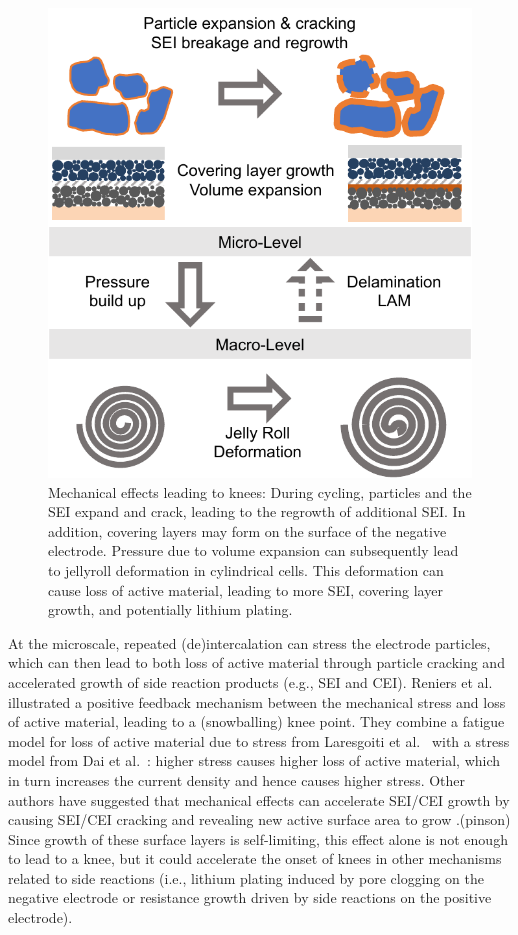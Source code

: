 \documentclass[journal=jpcl, manuscript=article, layout=onecolumn]{achemso}
\begin{document}
\begin{figure}
\centering
\includegraphics[scale = 1]{figures/MechanicalKneepoints.pdf}
\caption{Mechanical effects leading to knees: During cycling, particles and the SEI expand and crack, leading to the regrowth of additional SEI. In addition, covering layers may form on the surface of the negative electrode. Pressure due to volume expansion can subsequently lead to jellyroll deformation in cylindrical cells. This deformation can cause loss of active material, leading to more SEI, covering layer growth, and potentially lithium plating.}
\label{fig:knee_mechanical}
\end{figure}

At the microscale, repeated (de)intercalation can stress the electrode particles, which can then lead to both loss of active material through particle cracking and accelerated growth of side reaction products (e.g., SEI and CEI).
Reniers et al.~\cite{reniers_review_2019} illustrated a positive feedback mechanism between the mechanical stress and loss of active material, leading to a (snowballing) knee point. They combine a fatigue model for loss of active material due to stress from Laresgoiti et al.~\cite{laresgoiti_modeling_2015} with a stress model from Dai et al.~\cite{dai_simulation_2014}: higher stress causes higher loss of active material, which in turn increases the current density and hence causes higher stress.
Other authors have suggested that mechanical effects can accelerate SEI/CEI growth by causing SEI/CEI cracking and revealing new active surface area to grow \cite{kupper_end--life_2018,louli_operando_2019}.(pinson) Since growth of these surface layers is self-limiting, this effect alone is not enough to lead to a knee, but it could accelerate the onset of knees in other mechanisms related to side reactions (i.e., lithium plating induced by pore clogging on the negative electrode or resistance growth driven by side reactions on the positive electrode).
\end{document}
